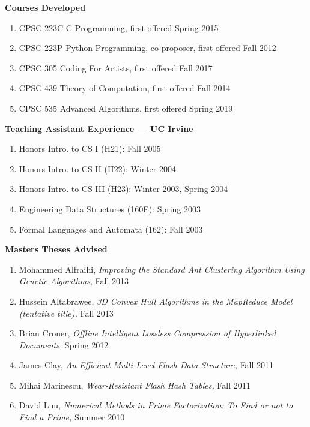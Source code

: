 \documentclass[11pt]{letter}
\begin{document}
\textbf{Courses Developed}
\begin{enumerate}
\item CPSC 223C C Programming, first offered Spring 2015
\item CPSC 223P Python Programming, co-proposer, first offered Fall 2012
\item CPSC 305 Coding For Artists, first offered Fall 2017
\item CPSC 439 Theory of Computation, first offered Fall 2014
\item CPSC 535 Advanced Algorithms, first offered Spring 2019
\end{enumerate}

\textbf{Teaching Assistant Experience --- UC Irvine}
\begin{enumerate}
\item Honors Intro. to CS I (H21): Fall 2005
\item Honors Intro. to CS II (H22): Winter 2004
\item Honors Intro. to CS III (H23): Winter 2003, Spring 2004
\item Engineering Data Structures (160E): Spring 2003
\item Formal Languages and Automata (162): Fall 2003
\end{enumerate}


\textbf{Masters Theses Advised}
\begin{enumerate}
\item Mohammed Alfraihi, \emph{Improving the Standard Ant Clustering Algorithm Using Genetic Algorithms}, Fall 2013
\item Hussein Altabrawee, \emph{3D Convex Hull Algorithms in the MapReduce Model (tentative title),} Fall 2013
\item Brian Croner, \emph{Offline Intelligent Lossless Compression of Hyperlinked Documents,} Spring 2012
\item James Clay, \emph{An Efficient Multi-Level Flash Data Structure,} Fall 2011
\item Mihai Marinescu, \emph{Wear-Resistant Flash Hash Tables,} Fall 2011
\item David Luu, \emph{Numerical Methods in Prime Factorization: To Find or not to Find a Prime,} Summer 2010
\end{enumerate}
\end{document}
